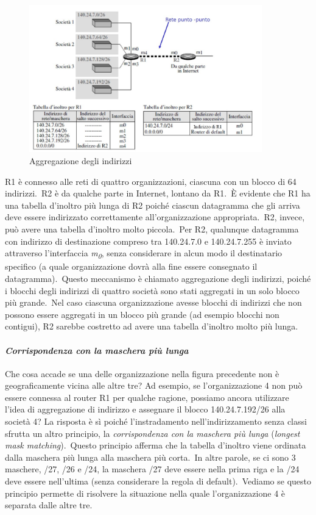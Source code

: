 \begin{figure}[H]
    \centering
    \includegraphics[width=0.9\textwidth]{immagini/Aggrregazione_indirizzi.jpg}
    \caption*{Aggregazione degli indirizzi}
\end{figure}

R1 è connesso alle reti di quattro organizzazioni, ciascuna con un blocco di 64 indirizzi.\
R2 è da qualche parte in Internet, lontano da R1.\
È evidente che R1 ha una tabella d'inoltro più lunga di R2 poiché ciascun datagramma che gli arriva deve essere indirizzato correttamente all'organizzazione appropriata.\
R2, invece, può avere una tabella d'inoltro molto piccola.\
Per R2, qualunque datagramma con indirizzo di destinazione compreso tra 140.24.7.0 e 140.24.7.255 è inviato attraverso l'interfaccia \emph{m\textsubscript{0}}, senza considerare in alcun modo il destinatario specifico (a quale organizzazione dovrà alla fine essere consegnato il datagramma).\
Questo meccanismo è chiamato aggregazione degli indirizzi, poiché i blocchi degli indirizzi di quattro società sono stati aggregati in un solo blocco più grande.\
Nel caso ciascuna organizzazione avesse blocchi di indirizzi che non possono essere aggregati in un blocco più grande (ad esempio blocchi non contigui), R2 sarebbe costretto ad avere una tabella d'inoltro molto più lunga.

\paragraph{\emph{Corrispondenza con la maschera più lunga}}

Che cosa accade se una delle organizzazione nella figura precedente non è geograficamente vicina alle altre tre? Ad esempio, se l'organizzazione 4 non può essere connessa al router R1 per qualche ragione, possiamo ancora utilizzare l'idea di aggregazione di indirizzo e assegnare il blocco 140.24.7.192\slash26 alla società 4? La risposta è sì poiché l'instradamento nell'indirizzamento senza classi sfrutta un altro principio, la \emph{corrispondenza con la maschera più lunga} (\emph{longest mask matching}).\
Questo principio afferma che la tabella d'inoltro viene ordinata dalla maschera più lunga alla maschera più corta.\
In altre parole, se ci sono 3 maschere, \slash27, \slash26 e \slash24, la maschera \slash27 deve essere nella prima riga e la \slash24 deve essere nell'ultima (senza considerare la regola di default).\
Vediamo se questo principio permette di risolvere la situazione nella quale l'organizzazione 4 è separata dalle altre tre.

